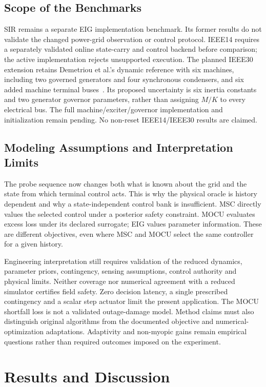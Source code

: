 \documentclass[journal]{IEEEtran}
\begin{document}
\subsection{Scope of the Benchmarks}
SIR remains a separate EIG implementation benchmark. Its former results do
not validate the changed power-grid observation or control protocol.
IEEE14 requires a separately validated online state-carry and control backend
before comparison; the active implementation rejects unsupported execution.
The planned IEEE30 extension retains Demetriou et al.'s dynamic reference
with six machines, including two governed generators and four synchronous
condensers, and six added machine terminal buses~\cite{demetriou2017dynamic}.
Its proposed uncertainty is six inertia constants and two generator governor
parameters, rather than assigning $M/K$ to every electrical bus. The full
machine/exciter/governor implementation and initialization remain pending.
No non-reset IEEE14/IEEE30 results are claimed.

\subsection{Modeling Assumptions and Interpretation Limits}
The probe sequence now changes both what is known about the grid and the
state from which terminal control acts. This is why the physical oracle is
history dependent and why a state-independent control bank is insufficient.
MSC directly values the selected control under a posterior safety constraint.
MOCU evaluates excess loss under its declared surrogate; EIG values parameter
information. These are different objectives, even where MSC and MOCU select
the same controller for a given history.

Engineering interpretation still requires validation of the reduced dynamics,
parameter priors, contingency, sensing assumptions, control authority and
physical limits. Neither coverage nor numerical agreement with a reduced
simulator certifies field safety. Zero decision latency, a single prescribed
contingency and a scalar step actuator limit the present application.
The MOCU shortfall loss is not a validated outage-damage model. Method claims
must also distinguish original algorithms from the documented objective and
numerical-optimization adaptations. Adaptivity and non-myopic gains remain
empirical questions rather than required outcomes imposed on the experiment.

\section{Results and Discussion}
\label{sec:results}
\end{document}
